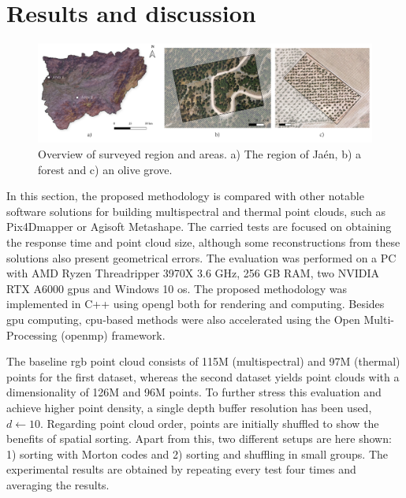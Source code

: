 \section{Results and discussion}

\begin{figure}
    \centering
    \includegraphics[width=\linewidth]{figs/multi_thermal_projection/study area.png}
    \caption{Overview of surveyed region and areas. a) The region of Jaén, b) a forest and c) an olive grove. }
\label{fig:occlusion_study_area}
\end{figure}

In this section, the proposed methodology is compared with other notable software solutions for building multispectral and thermal point clouds, such as Pix4Dmapper or Agisoft Metashape. The carried tests are focused on obtaining the response time and point cloud size, although some reconstructions from these solutions also present geometrical errors. The evaluation was performed on a PC with AMD Ryzen Threadripper 3970X 3.6 GHz, 256 GB RAM, two NVIDIA RTX A6000 \acrshort{gpu}s and Windows 10 \acrshort{os}. The proposed methodology was implemented in C++ using \acrshort{opengl} both for rendering and computing. Besides \acrshort{gpu} computing, \acrshort{cpu}-based methods were also accelerated using the Open Multi-Processing (\acrshort{openmp}) framework.

The baseline \acrshort{rgb} point cloud consists of 115M (multispectral) and 97M (thermal) points for the first dataset, whereas the second dataset yields point clouds with a dimensionality of 126M and 96M points. To further stress this evaluation and achieve higher point density, a single depth buffer resolution has been used, $d\gets 10$. Regarding point cloud order, points are initially shuffled to show the benefits of spatial sorting. Apart from this, two different setups are here shown: 1) sorting with Morton codes and 2) sorting and shuffling in small groups. The experimental results are obtained by repeating every test four times and averaging the results. 

